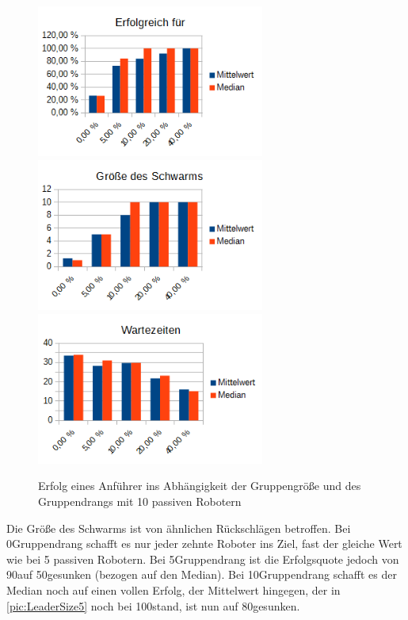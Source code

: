 \begin{figure}[h]
	\includegraphics[width=7.5cm, keepaspectratio]{graphics/Statistics/Leader/FlockSize/10_1.png}
	\includegraphics[width=7.5cm, keepaspectratio]{graphics/Statistics/Leader/FlockSize/10_2.png}
	\includegraphics[width=7.5cm, keepaspectratio]{graphics/Statistics/Leader/FlockSize/10_3.png}
	\caption{Erfolg eines Anführer ins Abhängigkeit der Gruppengröße und des Gruppendrangs mit 10 passiven Robotern}
	\label{pic:LeaderSize10}
\end{figure}

Die Größe des Schwarms ist von ähnlichen Rückschlägen betroffen. Bei 0\per Gruppendrang schafft es nur jeder zehnte Roboter ins Ziel, fast der gleiche Wert wie bei 5 passiven Robotern. Bei 5\per Gruppendrang ist die Erfolgsquote jedoch von 90\per auf 50\per gesunken (bezogen auf den Median).
Bei 10\per Gruppendrang schafft es der Median noch auf einen vollen Erfolg, der Mittelwert hingegen, der in \autoref{pic:LeaderSize5} noch bei 100\per stand, ist nun auf 80\per gesunken.

